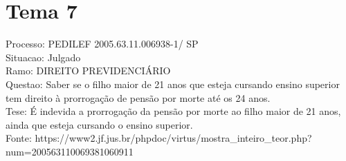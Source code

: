 \documentclass[12pt]{article}
\begin{document}
\section*{Tema 7}
Processo: PEDILEF 2005.63.11.006938-1/ SP\\
Situacao: Julgado\\
Ramo: DIREITO PREVIDENCIÁRIO\\
Questao: Saber se o filho maior de 21 anos que esteja cursando ensino superior tem direito à prorrogação de pensão por morte até os 24 anos.\\
Tese: É indevida a prorrogação da pensão por morte ao filho maior de 21 anos, ainda que esteja cursando o ensino superior.\\
Fonte: https://www2.jf.jus.br/phpdoc/virtus/mostra\_inteiro\_teor.php?num=200563110069381060911
\end{document}
